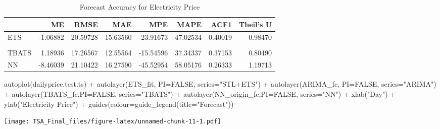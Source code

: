 \documentclass[
]{article}
\newenvironment{Shaded}{\begin{snugshade}}{\end{snugshade}}
\newcommand{\AttributeTok}[1]{\textcolor[rgb]{0.77,0.63,0.00}{#1}}
\newcommand{\ConstantTok}[1]{\textcolor[rgb]{0.00,0.00,0.00}{#1}}
\newcommand{\FunctionTok}[1]{\textcolor[rgb]{0.00,0.00,0.00}{#1}}
\newcommand{\NormalTok}[1]{#1}
\newcommand{\SpecialCharTok}[1]{\textcolor[rgb]{0.00,0.00,0.00}{#1}}
\newcommand{\StringTok}[1]{\textcolor[rgb]{0.31,0.60,0.02}{#1}}
\begin{document}
\begin{table}[!h]

\caption{\label{tab:unnamed-chunk-10}Forecast Accuracy for Electricity Price}
\centering
\begin{tabular}[t]{l|r|r|r|r|r|r|r}
\hline
  & ME & RMSE & MAE & MPE & MAPE & ACF1 & Theil's U\\
\hline
ETS & -1.06882 & 20.59728 & 15.63560 & -23.91673 & 47.02534 & 0.40019 & 0.98470\\
\hline
\cellcolor{gray!6}{ARIMA} & \cellcolor{gray!6}{0.62379} & \cellcolor{gray!6}{17.25831} & \cellcolor{gray!6}{12.67810} & \cellcolor{gray!6}{-17.28693} & \cellcolor{gray!6}{38.19677} & \cellcolor{gray!6}{0.36860} & \cellcolor{gray!6}{0.81055}\\
\hline
TBATS & 1.18936 & 17.26567 & 12.55564 & -15.54596 & 37.34337 & 0.37153 & 0.80490\\
\hline
NN & -8.46039 & 21.10422 & 16.27590 & -45.52954 & 58.05176 & 0.26333 & 1.19713\\
\hline
\end{tabular}
\end{table}

\begin{Shaded}
\begin{Highlighting}[]
\FunctionTok{autoplot}\NormalTok{(dailyprice.test.ts) }\SpecialCharTok{+}
  \FunctionTok{autolayer}\NormalTok{(ETS\_fit, }\AttributeTok{PI=}\ConstantTok{FALSE}\NormalTok{, }\AttributeTok{series=}\StringTok{"STL+ETS"}\NormalTok{) }\SpecialCharTok{+}
  \FunctionTok{autolayer}\NormalTok{(ARIMA\_fc, }\AttributeTok{PI=}\ConstantTok{FALSE}\NormalTok{, }\AttributeTok{series=}\StringTok{"ARIMA"}\NormalTok{) }\SpecialCharTok{+}
  \FunctionTok{autolayer}\NormalTok{(TBATS\_fc,}\AttributeTok{PI=}\ConstantTok{FALSE}\NormalTok{, }\AttributeTok{series=}\StringTok{"TBATS"}\NormalTok{) }\SpecialCharTok{+}
  \FunctionTok{autolayer}\NormalTok{(NN\_origin\_fc,}\AttributeTok{PI=}\ConstantTok{FALSE}\NormalTok{, }\AttributeTok{series=}\StringTok{"NN"}\NormalTok{) }\SpecialCharTok{+}
  \FunctionTok{xlab}\NormalTok{(}\StringTok{"Day"}\NormalTok{) }\SpecialCharTok{+} \FunctionTok{ylab}\NormalTok{(}\StringTok{"Electricity Price"}\NormalTok{) }\SpecialCharTok{+}
  \FunctionTok{guides}\NormalTok{(}\AttributeTok{colour=}\FunctionTok{guide\_legend}\NormalTok{(}\AttributeTok{title=}\StringTok{"Forecast"}\NormalTok{))}
\end{Highlighting}
\end{Shaded}

\texttt{[image: TSA\_Final\_files/figure-latex/unnamed-chunk-11-1.pdf]}
\end{document}
